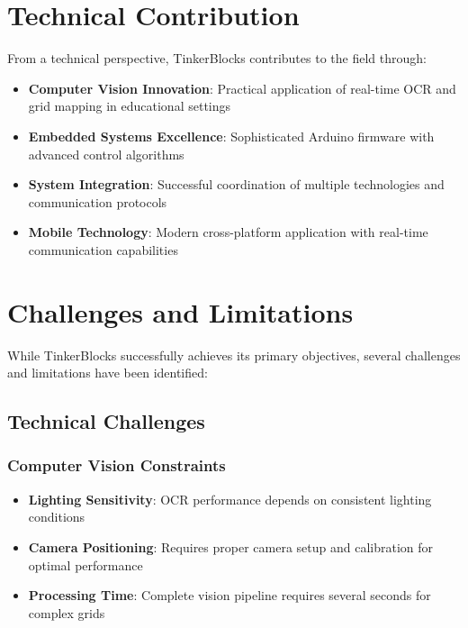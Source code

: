\section{Technical Contribution}

From a technical perspective, TinkerBlocks contributes to the field through:
\begin{itemize}
    \item \textbf{Computer Vision Innovation}: Practical application of real-time OCR and grid mapping in educational settings
    \item \textbf{Embedded Systems Excellence}: Sophisticated Arduino firmware with advanced control algorithms
    \item \textbf{System Integration}: Successful coordination of multiple technologies and communication protocols
    \item \textbf{Mobile Technology}: Modern cross-platform application with real-time communication capabilities
\end{itemize}

\section{Challenges and Limitations}

While TinkerBlocks successfully achieves its primary objectives, several challenges and limitations have been identified:

\subsection{Technical Challenges}

\subsubsection{Computer Vision Constraints}
\begin{itemize}
    \item \textbf{Lighting Sensitivity}: OCR performance depends on consistent lighting conditions
    \item \textbf{Camera Positioning}: Requires proper camera setup and calibration for optimal performance
    \item \textbf{Processing Time}: Complete vision pipeline requires several seconds for complex grids
\end{itemize}

